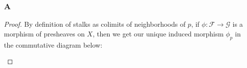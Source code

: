 \documentclass{article}
\newcommand{\fF}{\mathscr{F}}
\newcommand{\fG}{\mathscr{G}}
\DeclareMathOperator{\res}{res}
\begin{document}
\subsubsection{A}\label{2.3.A}
\begin{proof}
    By definition of stalks as colimits of neighborhoods of $p$, if $\phi:\fF\to \fG$ is a morphism of presheaves on $X$, then we get our unique induced morphism $\phi_p$ in the commutative diagram below:
    \begin{center}
    \end{center}
\end{proof}
\end{document}
